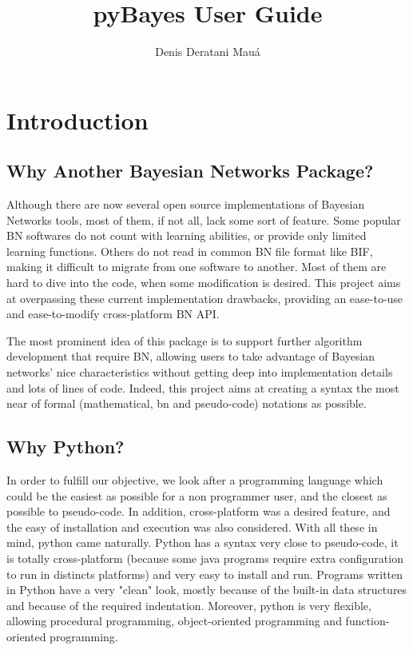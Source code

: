 \documentclass[10pt,a4paper]{report}
\author{Denis Deratani Mau\'{a}}
\title{pyBayes User Guide}
\begin{document}
\maketitle

\tableofcontents

\chapter{Introduction}

\section{Why Another Bayesian Networks Package?}

Although there are now several open source implementations of Bayesian Networks tools, most of them, if not all, lack some sort of feature. Some popular BN softwares do not count with learning abilities, or provide only limited learning functions. Others do not read in common BN file format like BIF, making it difficult to migrate from one software to another. Most of them are hard to dive into the code, when some modification is desired. This project aims at overpassing these current implementation drawbacks, providing an ease-to-use and ease-to-modify cross-platform BN API.

The most prominent idea of this package is to support further algorithm development that require BN, allowing users to take advantage of Bayesian networks' nice characteristics without getting deep into implementation details and lots of lines of code. Indeed, this project aims at creating a syntax the most near of formal (mathematical, bn and pseudo-code) notations as possible.

\section{Why Python?}

In order to fulfill our objective, we look after a programming language which could be the easiest as possible for a non programmer user, and the closest as possible to pseudo-code. In addition, cross-platform was a desired feature, and the easy of installation and execution was also considered. With all these in mind, python came naturally. Python has a syntax very close to pseudo-code, it is totally cross-platform (because some java programs require extra configuration to run in distincts platforms) and very easy to install and run. Programs written in Python have a very "clean" look, mostly because of the built-in data structures and because of the required indentation. Moreover, python is very flexible, allowing procedural programming, object-oriented programming and function-oriented programming.
\end{document}
